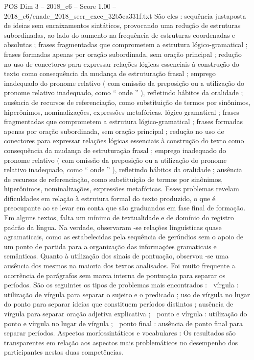 \begin{textsample}{POS Dim 3 – 2018\_c6 – Score 1.00 – 2018\_c6/enade\_2018\_secr\_exec\_32b5ea331f.txt}
São eles : sequência justaposta de ideias sem encaixamentos sintáticos, provocando uma redução de estruturas subordinadas, ao lado do aumento na frequência de estruturas coordenadas e absolutas ; frases fragmentadas que comprometem a estrutura lógico-gramatical ; frases formadas apenas por oração subordinada, sem oração principal ; redução no uso de conectores para expressar relações lógicas essenciais à construção do texto como consequência da mudança de estruturação frasal ; emprego inadequado do pronome relativo ( com omissão da preposição ou a utilização do pronome relativo inadequado, como “ onde ” ), refletindo hábitos da oralidade ; ausência de recursos de referenciação, como substituição de termos por sinônimos, hiperônimos, nominalizações, expressões metafóricas. lógico-gramatical ; frases fragmentadas que comprometem a estrutura lógico-gramatical ; frases formadas apenas por oração subordinada, sem oração principal ; redução no uso de conectores para expressar relações lógicas essenciais à construção do texto como consequência da mudança de estruturação frasal ; emprego inadequado do pronome relativo ( com omissão da preposição ou a utilização do pronome relativo inadequado, como “ onde ” ), refletindo hábitos da oralidade ; ausência de recursos de referenciação, como substituição de termos por sinônimos, hiperônimos, nominalizações, expressões metafóricas.
Esses problemas revelam dificuldades em relação à estrutura formal do texto produzido, o que é preocupante ao se levar em conta que são graduandos em fase final de formação.
Em alguns textos, falta um mínimo de textualidade e de domínio do registro padrão da língua.
Na verdade, observaram -se relações linguísticas quase agramaticais, como as estabelecidas pela sequência de gerúndios sem o apoio de um ponto de partida para a organização das informações gramaticais e semânticas.
Quanto à utilização dos sinais de pontuação, observou -se uma ausência dos mesmos na maioria dos textos analisados.
Foi muito frequente a ocorrência de parágrafos sem marca interna de pontuação para separar os períodos.
São os seguintes os tipos de problemas mais encontrados :  vírgula : utilização de vírgula para separar o sujeito e o predicado ; uso de vírgula no lugar do ponto para separar ideias que constituem períodos distintos ; ausência de vírgula para separar oração adjetiva explicativa ;  ponto e vírgula : utilização do ponto e vírgula no lugar de vírgula ;  ponto final : ausência de ponto final para separar períodos.
Aspectos morfossintáticos e vocabulares : Os resultados são transparentes em relação aos aspectos mais problemáticos no desempenho dos participantes nestas duas competências.

\end{textsample}
